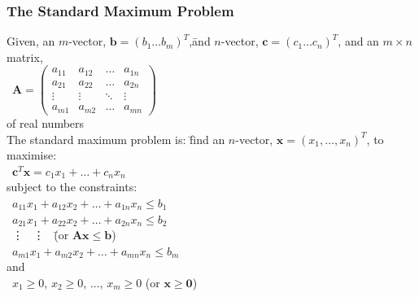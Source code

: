 \documentclass[10pt,letterpaper]{scrartcl}
\begin{document}
\begin{tabbing}
\subsubsection*{The Standard Maximum Problem}\begin{tabbing}
Given, an $m$-vector, $\mathbf{b}=(b_1\ldots b_m)^T$,\= and $n$-vector, $\mathbf{c}=(c_1\ldots c_n)^T$, and an $m\times n$ matrix, \\
\>\ $\displaystyle\mathbf{A} = \begin{pmatrix}
                                   a_{11} & a_{12} & \ldots & a_{1n} \\ 
                                   a_{21} & a_{22} & \ldots & a_{2n} \\
                                   \vdots & \vdots & \ddots & \vdots \\
                                   a_{m1} & a_{m2} & \ldots & a_{mn} 
                              \end{pmatrix}$ \\
of real numbers \\ 
The standard maximum problem is: \= find an $n$-vector, $\mathbf{x}=(x_1,\ldots , x_n)^T$, to maximise: \\
\>\ $\mathbf{c}^T\mathbf{x}=c_1x_1+\ldots +c_nx_n$ \\
subject to the constraints: \\ 
\>\ $a_{11}x_1 + a_{12}x_2 + \ldots + a_{1n}x_n \leq b_1$ \\
\>\ $a_{21}x_1 + a_{22}x_2 + \ldots + a_{2n}x_n \leq b_2$ \\
\>\ \vdots\ \hspace{12em} \vdots\ \hspace{2em} \=(or $\mathbf{Ax}\leq \mathbf{b}$) \\
\>\ $a_{m1}x_1 + a_{m2}x_2 + \ldots + a_{mn}x_n \leq b_m$ \\

and \\
\>\ $x_1 \geq 0$, $x_2 \geq 0$, $\ldots$, $x_m \geq 0$ \> (or $\mathbf{x} \geq \mathbf{0}$)\end{tabbing}

\end{tabbing}
\end{document}
